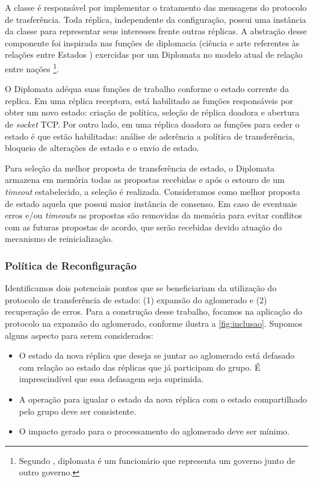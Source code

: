 
A classe  é responsável por implementar o tratamento das mensagens do
protocolo de trasferência. Toda réplica, independente da configuração, possui uma
instância da classe  para representar seus interesses frente outras
réplicas. A abstração desse componente foi inspirada nas funções de diplomacia (ciência e
arte referentes às relações entre Estados \cite{aurelio}) exercidas por um Diplomata no
modelo atual de relação entre nações \footnote{Segundo , diplomata é
um funcionário que representa um governo junto de outro governo.}.

O Diplomata adéqua suas funções de trabalho conforme o estado corrente da replica. Em uma
réplica receptora, está habilitado as funções responsáveis por obter um novo estado:
criação de política, seleção de réplica doadora e abertura de \emph{socket} TCP. Por outro
lado, em uma réplica doadora as funções para ceder o estado é que estão habilitadas:
análise de aderência a política de transferência, bloqueio de alterações de estado e o
envio de estado.

Para seleção da melhor proposta de transferência de estado, o Diplomata armazena em
memória todas as propostas recebidas e após o estouro de um \emph{timeout} estabelecido, a
seleção é realizada. Consideramos como melhor proposta de estado aquela que possui maior
instância de consenso. Em caso de eventuais erros e/ou \emph{timeouts} as propostas são
removidas da memória para evitar conflitos com as futuras propostas de acordo, que serão
recebidas devido atuação do mecanismo de reinicialização.

\subsubsection{Política de Reconfiguração}

Identificamos dois potenciais pontos que se beneficiariam da utilização do protocolo de
transferência de estado: (1) expansão do aglomerado e (2) recuperação de erros. Para a
construção desse trabalho, focamos na aplicação do protocolo na expansão do aglomerado,
conforme ilustra a \autoref{fig:inclusao}. Supomos alguns aspecto para serem considerados:

\begin{itemize}
  \item O estado da nova réplica que deseja se juntar ao aglomerado está defasado com
    relação ao estado das réplicas que já participam do grupo. É imprescindível que essa
    defasagem seja suprimida.
  \item A operação para igualar o estado da nova réplica com o estado compartilhado pelo
    grupo deve ser consistente.
  \item O impacto gerado para o processamento do aglomerado deve ser mínimo.
\end{itemize}

